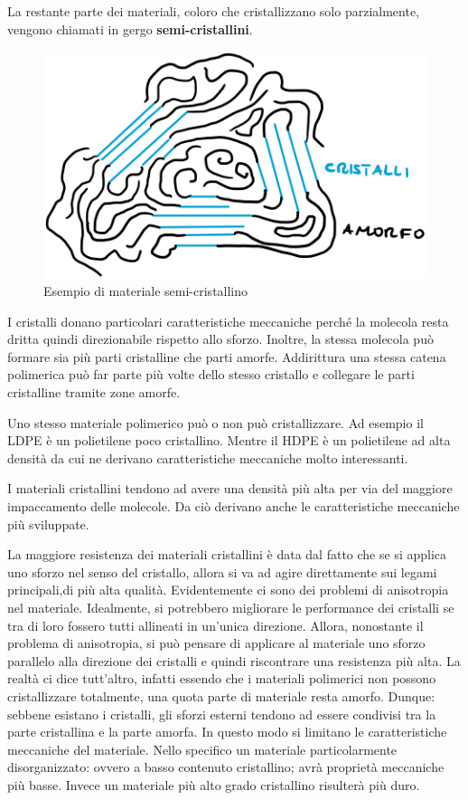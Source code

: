La restante parte dei materiali, coloro che cristallizzano solo parzialmente, vengono chiamati in gergo \textbf{semi-cristallini}.

\begin{figure}
\centering
\includegraphics[width = \textwidth]{gfx/Cristallinita}
\caption{Esempio di materiale semi-cristallino}
\label{fig:Cristallinita}
\end{figure}

I cristalli donano particolari caratteristiche meccaniche perché la molecola resta dritta quindi direzionabile rispetto allo sforzo.
Inoltre, la stessa molecola può formare sia più parti cristalline che parti amorfe. Addirittura una stessa catena polimerica può far parte più volte dello stesso cristallo e collegare le parti cristalline tramite zone amorfe.

Uno stesso materiale polimerico può o non può cristallizzare. Ad esempio il \ac{LDPE} è un polietilene poco cristallino. Mentre il \ac{HDPE} è un polietilene ad alta densità da cui ne derivano caratteristiche meccaniche molto interessanti.

I materiali cristallini tendono ad avere una densità più alta per via del maggiore impaccamento delle molecole. Da ciò derivano anche le caratteristiche meccaniche più sviluppate. 

La maggiore resistenza dei materiali cristallini è data dal fatto che se si applica uno sforzo nel senso del cristallo, allora si va ad agire direttamente sui legami principali,di più alta qualità. Evidentemente ci sono dei problemi di anisotropia nel materiale.
Idealmente, si potrebbero migliorare le performance dei cristalli se tra di loro fossero tutti allineati in un'unica direzione. Allora, nonostante il problema di anisotropia, si può pensare di applicare al materiale uno sforzo parallelo alla direzione dei cristalli e quindi riscontrare una resistenza più alta.
La realtà ci dice tutt'altro, infatti essendo che i materiali polimerici non possono cristallizzare totalmente, una quota parte di materiale resta amorfo. Dunque: sebbene esistano i cristalli, gli sforzi esterni tendono ad essere condivisi tra la parte cristallina e la parte amorfa. In questo modo si limitano le caratteristiche meccaniche del materiale.
Nello specifico un materiale particolarmente disorganizzato: ovvero a basso contenuto cristallino; avrà proprietà meccaniche più basse. Invece un materiale più alto grado cristallino risulterà più duro.

